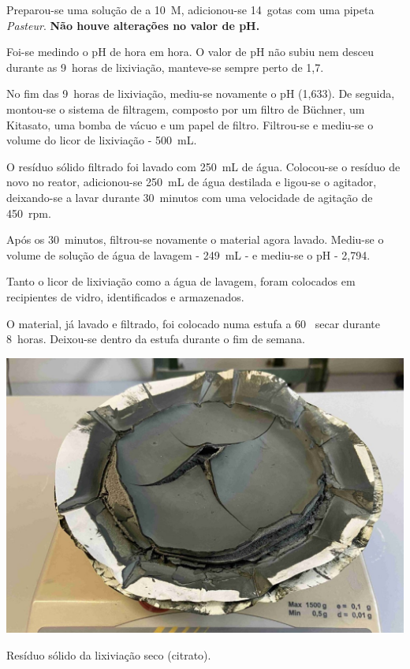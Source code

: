 Preparou-se uma solução de \hidso{} a 10~M, adicionou-se 14~gotas com uma pipeta \emph{Pasteur}.
\textbf{Não houve alterações no valor de pH.}

Foi-se medindo o pH de hora em hora.
O valor de pH não subiu nem desceu durante as 9~horas de lixiviação, manteve-se sempre perto de 1,7.

No fim das 9~horas de lixiviação, mediu-se novamente o pH (1,633).
De seguida, montou-se o sistema de filtragem, composto por um filtro de Büchner, um Kitasato, uma bomba de vácuo e um papel de filtro.
Filtrou-se e mediu-se o volume do licor de lixiviação - 500~mL.

O resíduo sólido filtrado foi lavado com 250~mL de água.
Colocou-se o resíduo de novo no reator, adicionou-se 250~mL de água destilada e ligou-se o agitador, deixando-se a lavar durante 30~minutos com uma velocidade de agitação de 450~rpm.

Após os 30~minutos, filtrou-se novamente o material agora lavado.
Mediu-se o volume de solução de água de lavagem - 249~mL - e mediu-se o pH - 2,794.

Tanto o licor de lixiviação como a água de lavagem, foram colocados em recipientes de vidro, identificados e armazenados.

O material, já lavado e filtrado, foi colocado numa estufa a 60~\graus{} secar durante 8~horas. 
Deixou-se dentro da estufa durante o fim de semana.

\begin{marginfigure}
    \centering
    \includegraphics[width=0.9\linewidth]{figures/Resíduo Sólido Lixiviação Citrato}
    \caption{Resíduo sólido da lixiviação seco (citrato).}
    \label{fig:residuo-solido-lix-citrato}
\end{marginfigure}

